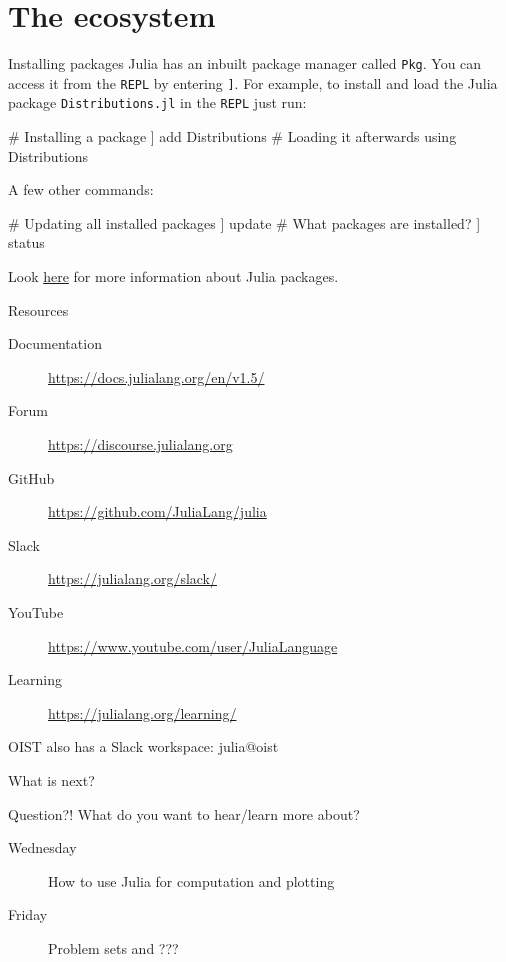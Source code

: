 \documentclass{beamer}
\newenvironment{Boxx}{\begin{tcolorbox}[standard jigsaw, opacityframe=0.8, opacityback=0.0]}{\end{tcolorbox}}
\begin{document}
\section{The ecosystem}
\begin{frame}[fragile]{Installing packages}
  Julia has an inbuilt package manager called \verb|Pkg|. You can access it from the \verb|REPL| by entering \verb|]|.
  For example, to install and load the Julia package \verb|Distributions.jl| in the \verb|REPL| just run:
\begin{Boxx}
  \begin{jllisting}
  # Installing a package
  ] add Distributions
  # Loading it afterwards
  using Distributions
  \end{jllisting}
\end{Boxx}
  A few other commands:
  \begin{Boxx}
  \begin{jllisting}
  # Updating all installed packages
  ] update
  # What packages are installed?
  ] status
  \end{jllisting}
\end{Boxx}
  Look \href{https://julialang.org/packages/}{\color{blue} here} for more information about Julia packages.
\end{frame}
\begin{frame}{Resources}
\begin{description}
	\item[Documentation] \url{https://docs.julialang.org/en/v1.5/}
	\item[Forum] \url{https://discourse.julialang.org}
	\item[GitHub] \url{https://github.com/JuliaLang/julia}
	\item[Slack] \url{https://julialang.org/slack/}
	\item[YouTube] \url{https://www.youtube.com/user/JuliaLanguage}
	\item[Learning] \url{https://julialang.org/learning/}
\end{description}
\vfill
OIST also has a Slack workspace: julia@oist
\end{frame}
\begin{frame}{What is next?}
  \begin{block}{Question?!}
    What do you want to hear/learn more about?
  \end{block}
  \begin{description}
    \item[Wednesday] How to use Julia for computation and plotting
    \item[Friday] Problem sets and ???
  \end{description}
\end{frame}
\end{document}
